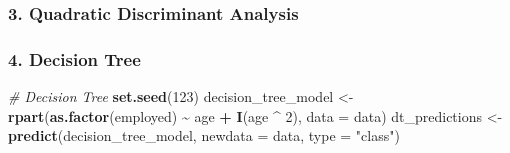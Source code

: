 \documentclass[
]{article}
\newenvironment{Shaded}{\begin{snugshade}}{\end{snugshade}}
\newcommand{\AttributeTok}[1]{\textcolor[rgb]{0.13,0.29,0.53}{#1}}
\newcommand{\CommentTok}[1]{\textcolor[rgb]{0.56,0.35,0.01}{\textit{#1}}}
\newcommand{\DecValTok}[1]{\textcolor[rgb]{0.00,0.00,0.81}{#1}}
\newcommand{\FunctionTok}[1]{\textcolor[rgb]{0.13,0.29,0.53}{\textbf{#1}}}
\newcommand{\NormalTok}[1]{#1}
\newcommand{\OtherTok}[1]{\textcolor[rgb]{0.56,0.35,0.01}{#1}}
\newcommand{\SpecialCharTok}[1]{\textcolor[rgb]{0.81,0.36,0.00}{\textbf{#1}}}
\newcommand{\StringTok}[1]{\textcolor[rgb]{0.31,0.60,0.02}{#1}}
\begin{document}
\begin{Shaded}
\end{Shaded}

\hypertarget{quadratic-discriminant-analysis}{%
\subsubsection{3. Quadratic Discriminant
Analysis}\label{quadratic-discriminant-analysis}}

\begin{Shaded}
\end{Shaded}

\hypertarget{decision-tree}{%
\subsubsection{4. Decision Tree}\label{decision-tree}}

\begin{Shaded}
\begin{Highlighting}[]
\CommentTok{\# Decision Tree}
\FunctionTok{set.seed}\NormalTok{(}\DecValTok{123}\NormalTok{)}
\NormalTok{decision\_tree\_model }\OtherTok{\textless{}{-}} \FunctionTok{rpart}\NormalTok{(}\FunctionTok{as.factor}\NormalTok{(employed) }\SpecialCharTok{\textasciitilde{}}\NormalTok{ age }\SpecialCharTok{+}  \FunctionTok{I}\NormalTok{(age }\SpecialCharTok{\^{}} \DecValTok{2}\NormalTok{), }\AttributeTok{data =}\NormalTok{ data)}
\NormalTok{dt\_predictions }\OtherTok{\textless{}{-}} \FunctionTok{predict}\NormalTok{(decision\_tree\_model, }\AttributeTok{newdata =}\NormalTok{ data, }\AttributeTok{type =} \StringTok{"class"}\NormalTok{)}
\end{Highlighting}
\end{Shaded}
\end{document}
